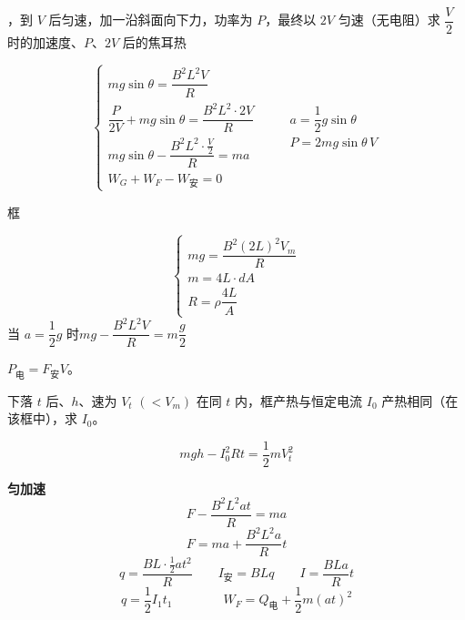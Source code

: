 \begin{problem}[④]
，到 $V$ 后匀速，加一沿斜面向下力，功率为 $P$，最终以 $2V$ 匀速（无电阻）\quad 求 $\dfrac{V}{2}$ 时的加速度、$P$、$2V$ 后的焦耳热
\begin{solution}
\[ \left\{\begin{array}{l}
mg\sin\theta=\dfrac{B^2L^2V}{R}\\[2.5ex]
\dfrac{P}{2V}+mg\sin\theta=\dfrac{B^2L^2\cdot 2V}{R}\\[2.5ex]
mg\sin\theta-\dfrac{B^2L^2\cdot\frac{V}{2}}{R}=ma\\[2.5ex]
W_G+W_F-W_{\text{安}}=0
\end{array}\right.\qquad \begin{array}{l}a=\dfrac{1}{2}g\sin\theta\\[2ex] P=2mg\sin\theta\,V\end{array} \] %
\end{solution}
\end{problem}
\begin{problem}[⑤]
框 %
\begin{solution}
\[ \left\{\begin{array}{l}
mg=\dfrac{B^2(2L)^2V_m}{R}\\[2.5ex]
m=4L\cdot dA\\[1ex]
R=\rho\dfrac{4L}{A}
\end{array}\right. \]
\qquad 当 $a=\dfrac{1}{2}g$ 时\quad $mg-\dfrac{B^2L^2V}{R}=m\dfrac{g}{2}$

$P_{\text{电}}=F_{\text{安}}V$。 %
\end{solution}
下落 $t$ 后、$h$、速为 $V_t$ $(<V_m)$ 在同 $t$ 内，框产热与恒定电流 $I_0$ 产热相同（在该框中），求 $I_0$。
\begin{solution}
\[ mgh-I_0^2Rt=\frac{1}{2}mV_t^2 \]
\end{solution}
\end{problem}
\textbf{匀加速}
\[ F-\frac{B^2L^2at}{R}=ma \]
\[ F=ma+\frac{B^2L^2a}{R}t \]
\[ q=\frac{BL\cdot\frac{1}{2}at^2}{R}\qquad I_{\text{安}}=BLq\qquad I=\frac{BLa}{R}t \] %
\[ q=\frac{1}{2}I_1t_1\qquad\qquad W_F=Q_{\text{电}}+\frac{1}{2}m(at)^2 \]
